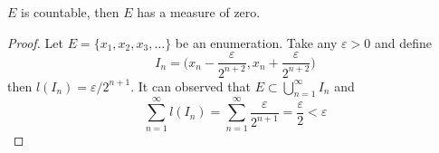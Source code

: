 \vspace{2ex}
\begin{ex}
$E$ is countable, then $E$ has a measure of zero.
\end{ex}
\vspace{2ex}
\begin{proof}
Let $E=\{x_1,x_2,x_3,\ldots \}$ be an enumeration. Take any $\varepsilon >0$ and define
\[I_{n}=\Big(x_{n}-\dfrac{\varepsilon }{2^{n+2}},x_{n}+\dfrac{\varepsilon }{2^{n+2}}\Big)\]
then $l(I_{n})=\varepsilon /2^{n+1}$. It can observed that $E\subset \bigcup^{\infty }_{n=1}I_{n}$ and 
\[\sum ^{\infty }_{n=1}l(I_{n})=\sum ^{\infty }_{n=1}\dfrac{\varepsilon }{2^{n+1}}=\dfrac{\varepsilon }{2}<\varepsilon \]
\end{proof}
\vspace{2ex}


